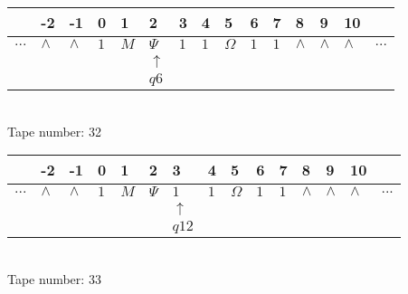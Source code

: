 \documentclass{article}
\begin{document}
\begin{table}[H]
\centering
\begin{tabular}{lllllllllllllll}
 & -2 & -1 & 0 & 1 & 2 & 3 & 4 & 5 & 6 & 7 & 8 & 9 & 10 & \\
\hline
$...$ & \multicolumn{1}{|l|}{$\wedge$} & \multicolumn{1}{|l|}{$\wedge$} & \multicolumn{1}{|l|}{$1$} & \multicolumn{1}{|l|}{$M$} & \multicolumn{1}{|l|}{$\Psi$} & \multicolumn{1}{|l|}{$1$} & \multicolumn{1}{|l|}{$1$} & \multicolumn{1}{|l|}{$\Omega$} & \multicolumn{1}{|l|}{$1$} & \multicolumn{1}{|l|}{$1$} & \multicolumn{1}{|l|}{$\wedge$} & \multicolumn{1}{|l|}{$\wedge$} & \multicolumn{1}{|l|}{$\wedge$} & $...$\\
\hline
&  &  &  &  & $\uparrow$ &  &  &  &  &  &  &  &  &  \\
&  &  &  &  & $ q6 $ &  &  &  &  &  &  &  &  &  \\
\end{tabular}
\\
Tape number: 32
\noindent\makebox[\linewidth]{\hdashrule{\textwidth}{1pt}{1pt}}\end{table}

\begin{table}[H]
\centering
\begin{tabular}{lllllllllllllll}
 & -2 & -1 & 0 & 1 & 2 & 3 & 4 & 5 & 6 & 7 & 8 & 9 & 10 & \\
\hline
$...$ & \multicolumn{1}{|l|}{$\wedge$} & \multicolumn{1}{|l|}{$\wedge$} & \multicolumn{1}{|l|}{$1$} & \multicolumn{1}{|l|}{$M$} & \multicolumn{1}{|l|}{$\Psi$} & \multicolumn{1}{|l|}{$1$} & \multicolumn{1}{|l|}{$1$} & \multicolumn{1}{|l|}{$\Omega$} & \multicolumn{1}{|l|}{$1$} & \multicolumn{1}{|l|}{$1$} & \multicolumn{1}{|l|}{$\wedge$} & \multicolumn{1}{|l|}{$\wedge$} & \multicolumn{1}{|l|}{$\wedge$} & $...$\\
\hline
&  &  &  &  &  & $\uparrow$ &  &  &  &  &  &  &  &  \\
&  &  &  &  &  & $ q12 $ &  &  &  &  &  &  &  &  \\
\end{tabular}
\\
Tape number: 33
\noindent\makebox[\linewidth]{\hdashrule{\textwidth}{1pt}{1pt}}\end{table}
\end{document}

